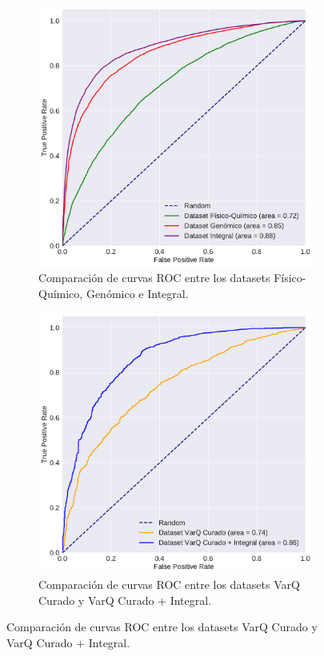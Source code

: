 \begin{figure}[H]
\centering
\begin{subfigure}[b]{0.6\textwidth}
    \centering
    \includegraphics[width=\textwidth]{documents/latex/figures/4/curvas_auc_humsavar.pdf}
    \caption{Comparación de curvas ROC entre los datasets Físico-Químico, Genómico e Integral.}
    \label{fig:curvas_auc_humsavar}
\end{subfigure}

\hfill
\hfill

\begin{subfigure}[b]{0.6\textwidth}
    \centering
    \includegraphics[width=\textwidth]{documents/latex/figures/4/curvas_auc_varq.pdf}
    \caption{Comparación de curvas ROC entre los datasets VarQ Curado y VarQ Curado + Integral.}
    \label{fig:curvas_auc_varq}
\end{subfigure}
\end{figure}


